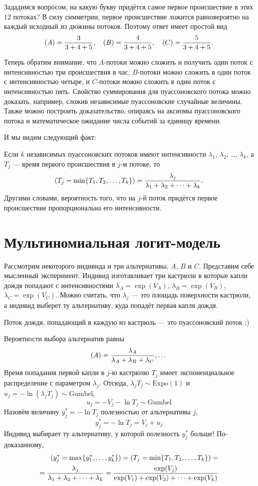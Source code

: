 \documentclass[12pt]{article}
\let\P\relax
\DeclareMathOperator{\P}{\mathbb{P}}
\newcommand{\dExpo}{\mathrm{Expo}} %
\newcommand{\dGumbel}{\mathrm{Gumbel}}
\begin{document}
Зададимся вопросом, на какую букву придётся самое первое происшествие в этих $12$ потоках?
В силу симметрии, первое происшествие ложится равновероятно на каждый исходный из дюжины потоков. 
Поэтому ответ имеет простой вид
\[
\P(A) = \frac{3}{3 + 4 + 5}, \quad \P(B) = \frac{4}{3 + 4 + 5}, \quad \P(C) = \frac{5}{3 + 4 + 5}.
\]

Теперь обратим внимание, что $A$-потоки можно сложить и получить один поток с интенсивностью три
происшествия в час, $B$-потоки можно сложить в один поток с интенсивностью четыре,
и $C$-потоки можно сложить в один поток с интенсивностью пять. 
Свойство суммирования для пуассоновского потока можно доказать, например, сложив независимые пуассоновские случайные величины.
Также можно построить доказательство, опираясь на аксиомы пуассоновского потока и математическое ожидание числа событий за единицу времени.

И мы видим следующий факт:

\begin{tcolorbox}[colback=yellow!50!red!25!white]
Если $k$ независимых пуассоновских потоков имеют интенсивности $\lambda_1$, $\lambda_2$, \dots, $\lambda_k$,
а $T_j$ — время первого происшествия в $j$-м потоке, то
\[
\P(T_j = \min\{T_1, T_2, \dots, T_k\}) = \frac{\lambda_j}{\lambda_1 + \lambda_2 + \dots + \lambda_k}.
\]
Другими словами, вероятность того, что на $j$-й поток придётся первое происшествие пропорциональна его интенсивности.
\end{tcolorbox}
    

\section*{Мультиномиальная логит-модель}

Рассмотрим некоторого индивида и три альтернативы, $A$, $B$ и $C$. 
Представим себе мысленный эксперимент. 
Индивид изготавливает три кастрюли в которые капли дождя попадают с интенсивностями $\lambda_A = \exp(V_A)$, 
$\lambda_B = \exp(V_B)$, $\lambda_C = \exp(V_C)$.
Можно считать, что $\lambda_j$ — это площадь поверхности кастрюли, а индивид выберет ту альтернативу, куда попадёт первая капля дождя.

Поток дождя, попадающий в каждую из кастрюль — это пуассоновский поток :)

Вероятности выбора альтернатив равны 
\[
\P(A) = \frac{\lambda_A}{\lambda_A + \lambda_B + \lambda_C}, \dots
\]
Время попадания первой капли в $j$-ю кастрюлю $T_j$ имеет экспоненциальное распределение с параметром $\lambda_j$.
Отсюда, $\lambda_j T_j \sim \dExpo(1)$ и $u_j = -\ln (\lambda_j T_j) \sim \dGumbel$,
\[
u_j = -V_j - \ln T_j \sim \dGumbel
\]
Назовём величину $y_j^* = -\ln T_j$ полезностью от альтернативы $j$,
\[
y_j^* = -\ln T_j = V_j + u_j
\]
Индивид выбирает ту альтернативу, у которой полезность $y_j^*$ больше!
По-доказанному,
\begin{align*}
\P(y_j^* = \max\{y_1^*, \dots, y_k^*\}) = \P(T_j = \min\{T_1, T_2, \dots, T_k\}) = \\
= \frac{\lambda_j}{\lambda_1 + \lambda_2 + \dots + \lambda_k} = 
\frac{\exp(V_j)}{\exp(V_1) + \exp(V_2) + \dots + \exp(V_k)}
\end{align*}
\end{document}
